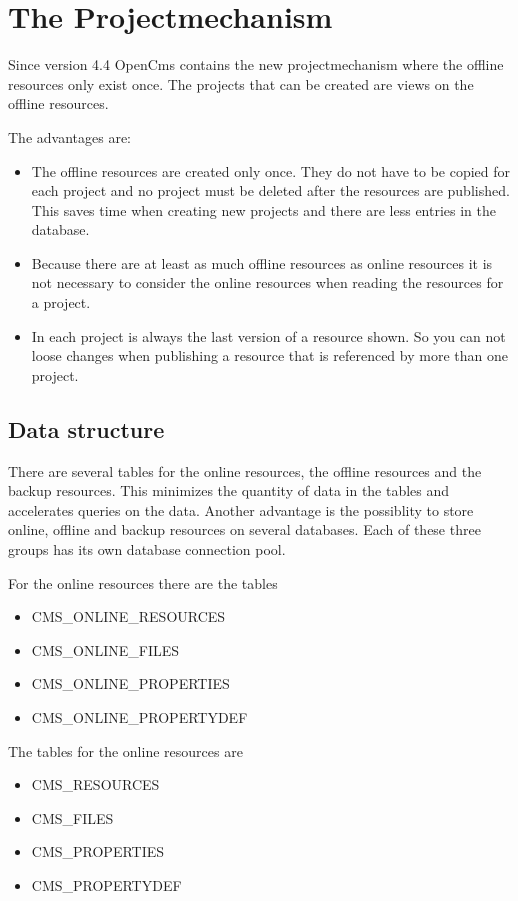 \section{The Projectmechanism}

Since version 4.4 OpenCms contains the new projectmechanism where the offline
resources only exist once. The projects that can be created are
views on the offline resources.

The advantages are:
\begin{itemize}
\item The offline resources are created only once. They do not have to be copied for each project and no project must be deleted after the resources are published. This saves time when creating new projects and there are less entries in the database.
\item Because there are at least as much offline resources as online resources it is not necessary to consider the online resources when reading the resources for a project.
\item In each project is always the last version of a resource shown. So you can not loose changes when publishing a resource that is referenced by more than one project.
\end{itemize}

\subsection{Data structure}
 
 

There are several tables for the online resources, the offline
resources and the backup resources. This minimizes the quantity of
data in the tables and accelerates queries on the data. Another
advantage is the possiblity to store online, offline and backup
resources on several databases. Each of these three groups has its
own database connection pool.

For the online resources there are the tables
\begin{itemize}
\item CMS\_ONLINE\_RESOURCES
\item CMS\_ONLINE\_FILES
\item CMS\_ONLINE\_PROPERTIES
\item CMS\_ONLINE\_PROPERTYDEF
\end{itemize}

The tables for the online resources are
\begin{itemize}
\item CMS\_RESOURCES
\item CMS\_FILES
\item CMS\_PROPERTIES
\item CMS\_PROPERTYDEF
\end{itemize}

